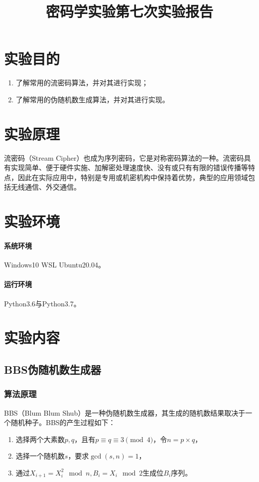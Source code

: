 \documentclass[a4paper, zihao=-4, UTF-8]{ctexart}
\title{\textbf{密码学实验第七次实验报告} }
\date{}
\begin{document}
	\maketitle
	\tableofcontents
	\newpage
	\section{实验目的}
	\begin{enumerate}[1.]
		\item 了解常用的流密码算法，并对其进行实现；
		\item 了解常用的伪随机数生成算法，并对其进行实现。
	\end{enumerate}
	\section{实验原理}
		流密码（Stream Cipher）也成为序列密码，它是对称密码算法的一种。流密码具有实现简单、便于硬件实施、加解密处理速度快、没有或只有有限的错误传播等特点，因此在实际应用中，特别是专用或机密机构中保持着优势，典型的应用领域包括无线通信、外交通信。
	\section{实验环境}
	\paragraph*{系统环境} Windows10 WSL Ubuntu20.04。
	\paragraph*{运行环境} Python3.6与Python3.7。
	\section{实验内容}
		\subsection{BBS伪随机数生成器}
			\subsubsection{算法原理}
				BBS（Blum  Blum Shub）是一种伪随机数生成器，其生成的随机数结果取决于一个随机种子。BBS的产生过程如下：
				\begin{enumerate}[1.]
					\item 选择两个大素数$p, q$，且有$p\equiv q\equiv 3\pmod 4$，令$n=p\times q$，
					\item 选择一个随机数$s$，要求$\gcd(s, n)=1$，
					\item 通过$X_{i+1}=X_i^2\mod n, B_i=X_i\mod 2$生成位$B_i$序列。
				\end{enumerate}
				
\end{document}

